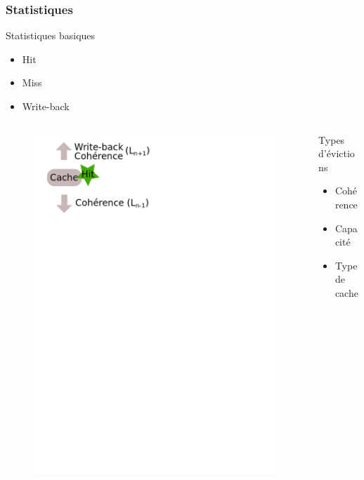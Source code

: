 \begin{frame}[fragile]
  \frametitle{Statistiques}
  
  \begin{block}{Statistiques basiques}
    \begin{itemize}
    \item{Hit}
    \item{Miss}
    \item{Write-back}
    \end{itemize}
  \end{block}
  
  \begin{columns}[T]
    \begin{column}{.5\textwidth}
      \begin{figure}[h!]
	\includegraphics[scale=.4]{images/evictions.png}
      \end{figure}
    \end{column}
    \begin{column}{.5\textwidth}
      \bigskip
      \begin{block}{Types d'évictions}
	\begin{itemize}
	\item{Cohérence}
        \item{Capacité}
        \item{Type de cache         }
	\end{itemize}
      \end{block}
    \end{column}
  \end{columns}
\end{frame}

